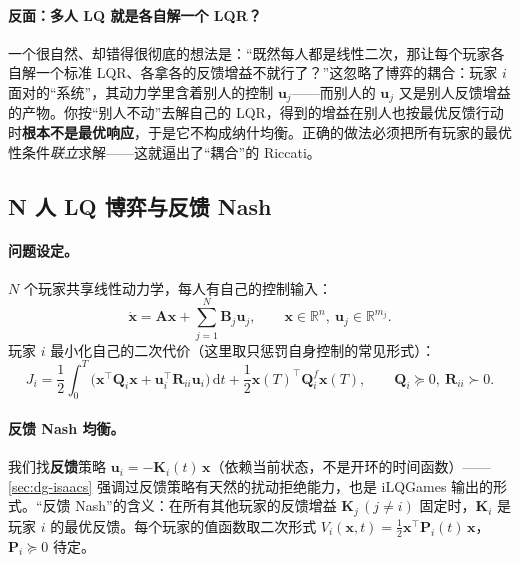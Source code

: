 \paragraph{反面：多人 LQ 就是各自解一个 LQR？}
一个很自然、却错得很彻底的想法是：“既然每人都是线性二次，那让每个玩家各自解一个标准 LQR、各拿各的反馈增益不就行了？”这忽略了博弈的耦合：玩家 $i$ 面对的“系统”，其动力学里含着别人的控制 $\mathbf u_j$——而别人的 $\mathbf u_j$ 又是别人反馈增益的产物。你按“别人不动”去解自己的 LQR，得到的增益在别人也按最优反馈行动时\textbf{根本不是最优响应}，于是它不构成纳什均衡。正确的做法必须把所有玩家的最优性条件\emph{联立}求解——这就逼出了“耦合”的 Riccati。

\subsection{N 人 LQ 博弈与反馈 Nash}
\label{sec:dg-lq-setup}
\paragraph{问题设定。}
$N$ 个玩家共享线性动力学，每人有自己的控制输入：
\begin{equation}
  \dot{\mathbf x}=\mathbf A\mathbf x+\sum_{j=1}^N \mathbf B_j \mathbf u_j,\qquad \mathbf x\in\mathbb{R}^n,\ \mathbf u_j\in\mathbb{R}^{m_j}.
  \label{eq:dg-lq-dyn}
\end{equation}
玩家 $i$ 最小化自己的二次代价（这里取只惩罚自身控制的常见形式）：
\begin{equation}
  J_i=\frac12\int_0^T\Big(\mathbf x^\top \mathbf Q_i \mathbf x+\mathbf u_i^\top \mathbf R_{ii}\mathbf u_i\Big)\,\mathrm dt+\frac12 \mathbf x(T)^\top \mathbf Q_i^f \mathbf x(T),\qquad \mathbf Q_i\succeq0,\ \mathbf R_{ii}\succ0.
  \label{eq:dg-lq-cost}
\end{equation}

\paragraph{反馈 Nash 均衡。}
我们找\textbf{反馈}策略 $\mathbf u_i=-\mathbf K_i(t)\,\mathbf x$（依赖当前状态，不是开环的时间函数）——\cref{sec:dg-isaacs} 强调过反馈策略有天然的扰动拒绝能力，也是 iLQGames 输出的形式。“反馈 Nash”的含义：在所有其他玩家的反馈增益 $\mathbf K_j\,(j\ne i)$ 固定时，$\mathbf K_i$ 是玩家 $i$ 的最优反馈。每个玩家的值函数取二次形式 $V_i(\mathbf x,t)=\tfrac12 \mathbf x^\top \mathbf P_i(t)\,\mathbf x$，$\mathbf P_i\succeq0$ 待定。

